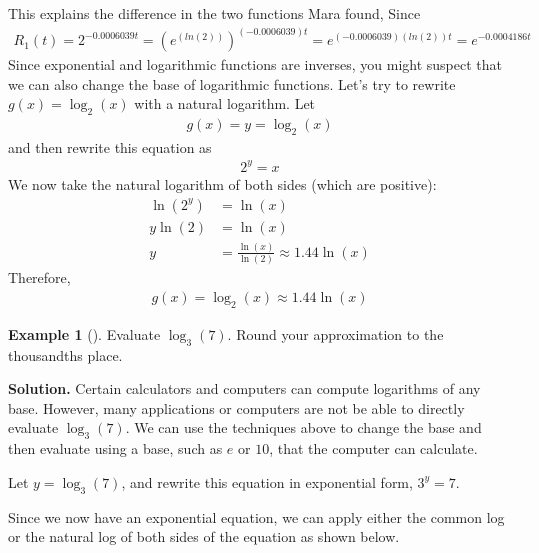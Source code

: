 \documentclass[10pt,]{book}
\theoremstyle{plain}
\theoremstyle{definition}
\theoremstyle{definition}
\newtheorem{example}[theorem]{Example}
\theoremstyle{definition}
\numberwithin{equation}{section}
\newcommand{\amp}{&}
\begin{document}
This explains the difference in the two functions Mara found, Since%
\begin{gather*}
R_1(t) = 2^{-0.0006039t} = \left( e^{\left( ln(2) \right)} \right)^{\left( -0.0006039 \right) t} = e^{\left( -0.0006039 \right) \left( ln(2) \right) t } = e^{-0.0004186t}
\end{gather*}
Since exponential and logarithmic functions are inverses, you might suspect that we can also change the base of logarithmic functions.  Let's try to rewrite \(g(x) = \log_2 \left( x \right)\) with a natural logarithm. Let%
\begin{gather*}
g(x) = y = \log_2 \left( x \right)
\end{gather*}
and then rewrite this equation as%
\begin{gather*}
2^y = x
\end{gather*}
We now take the natural logarithm of both sides (which are positive):%
\begin{align*}
\ln \left( 2^y \right) \amp = \ln \left( x \right)\\
y \ln \left( 2 \right) \amp = \ln \left( x \right)\\
y \amp = \frac{\ln \left( x \right)}{\ln \left( 2 \right)} \approx 1.44 \ln \left( x \right)
\end{align*}
Therefore,%
\begin{gather*}
g(x) = \log_2 \left( x \right) \approx 1.44 \ln \left( x \right)
\end{gather*}
%
\begin{example}[]\label{example-32}
\hypertarget{p-381}{}%
Evaluate \(\log_3 \left( 7 \right)\). Round your approximation to the thousandths place.%
\par\smallskip%
\noindent\textbf{Solution.}\hypertarget{solution-32}{}\quad%
\hypertarget{p-382}{}%
Certain calculators and computers can compute logarithms of any base. However, many applications or computers are not be able to directly evaluate \(\log_3 \left( 7 \right)\). We can use the techniques above to change the base and then evaluate using a base, such as \(e\) or \(10\), that the computer can calculate.%
\par
\hypertarget{p-383}{}%
Let \(y = \log_3 \left( 7 \right)\), and rewrite this equation in exponential form, \(3^y = 7\).%
\par
\hypertarget{p-384}{}%
Since we now have an exponential equation, we can apply either the common log or the natural log of both sides of the equation as shown below.%
\end{example}
\typeout{************************************************}
\typeout{************************************************}
\end{document}
